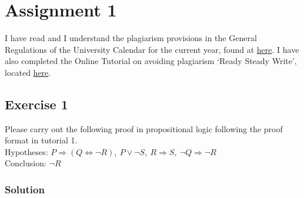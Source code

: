 \documentclass[12pt]{article}
\begin{document}
\section*{Assignment 1}

I have read and I understand the plagiarism provisions in the General Regulations of the University Calendar for the current year, found at \href{http://www.tcd.ie/calendar}{here}. I have also completed the Online Tutorial on avoiding plagiarism ‘Ready Steady Write’, located \href{http://tcd-ie.libguides.com/plagiarism/ready-steady-write}{here}.

\subsection*{Exercise 1}

Please carry out the following proof in propositional logic following the proof format in tutorial 1.\\
Hypotheses: $ P \Rightarrow (Q \Leftrightarrow \neg R),\ P \vee \neg S,\ R \Rightarrow S,\ \neg Q \Rightarrow \neg R $\\
Conclusion: $ \neg R $

\subsubsection*{Solution}
\end{document}
